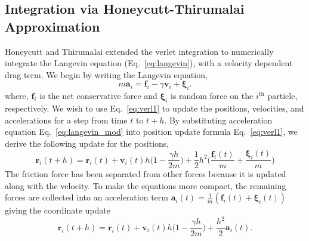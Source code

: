 \documentclass[../talant.diss.submit.tex]{subfiles}
\begin{document}
\subsection{\textbf{Integration via Honeycutt-Thirumalai Approximation}}
Honeycutt and Thirumalai\cite{Honeycutt:92} extended the verlet integration to numerically integrate the Langevin
equation (Eq.~\ref{eq:langevin}), with a velocity dependent drag term.
We begin by writing the Langevin equation,
%
%
\begin{equation}
  \label{eq:langevin_mod}
  m \bm{a}_{i} = \bm{f}_i - \gamma \bm{v}_i +  \bm{\xi}_i. 
\end{equation}
%
%
where, $\bm{f}_i$ is the net conservative force and $\bm{\xi}_i$ is random force on the
$i^{\mathrm{th}}$ particle, respectively.
We wish to use Eq.~\ref{eq:verl1} to update the positions, velocities, and accelerations
for a step from time $t$ to $t+h$.
By substituting acceleration equation Eq.~\ref{eq:langevin_mod} into position update formula
Eq.~\ref{eq:verl1}, we derive the following update for the positions,
%
\begin{equation}
  \label{eq:coord_update}
  \bm{r}_{i}(t+h) = \bm{r}_{i}(t) + \bm{v}_{i}(t)h \Big(1 - \frac{\gamma h}{2m} \Big) +
  \frac{1}{2}h^2 \Big(\frac{\bm{f}_{i}(t)}{m} + \frac{\bm{\xi}_{i}(t)}{m} \Big)
\end{equation}
%
The friction force has been separated from other forces because it is updated along with the velocity.
To make the equations more compact, the remaining forces are collected into an acceleration term 
$\bm{a}_{i}(t) = \frac{1}{m}(\bm{f}_{i}(t) + \bm{\xi}_{i}(t))$ giving the coordinate update
%
\begin{equation}
  \label{eq:coord_update_simple}
  \bm{r}_{i}(t+h) = \bm{r}_{i}(t) + \bm{v}_{i}(t)h \Big(1 - \frac{\gamma h}{2m} \Big) + \frac{h^2}{2} \bm{a}_{i}(t). 
\end{equation}
%
\end{document}
